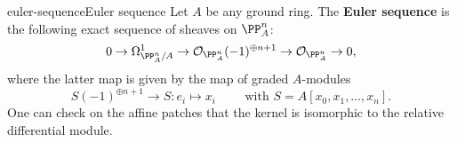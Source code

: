 



\begin{topic}{euler-sequence}{Euler sequence}
    Let $A$ be any ground ring. The \textbf{Euler sequence} is the following exact sequence of sheaves on $\PP_A^n$:
    \[ 0 \rightarrow \Omega^1_{\PP^n_A/A} \rightarrow \mathcal{O}_{\PP_A^n}(-1)^{\oplus n + 1} \rightarrow \mathcal{O}_{\PP_A^n} \rightarrow 0 , \]
    where the latter map is given by the map of graded $A$-modules
    \[ S(-1)^{\oplus n + 1} \to S : e_i \mapsto x_i \qquad \text{ with } S = A[x_0, x_1, \ldots, x_n] . \]
    One can check on the affine patches that the kernel is isomorphic to the relative differential module.
\end{topic}
